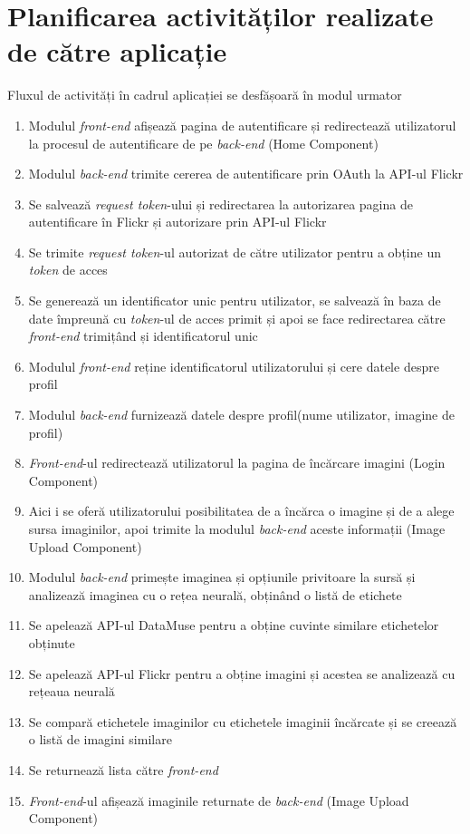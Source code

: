 \section{Planificarea activităților realizate de către aplicație}
Fluxul de activități în cadrul aplicației se desfășoară în modul urmator
\begin{enumerate}
    \item Modulul \textit{front-end} afișează pagina de autentificare și redirectează utilizatorul la procesul de autentificare de pe \textit{back-end} (Home Component)
    \item Modulul \textit{back-end} trimite cererea de autentificare prin OAuth la API-ul Flickr
    \item  Se salvează \textit{request token}-ului și redirectarea la autorizarea pagina de autentificare în Flickr și autorizare prin API-ul Flickr
    \item Se trimite \textit{request token}-ul autorizat de către utilizator pentru a obține un \textit{token} de acces
    \item  Se generează un identificator unic pentru utilizator, se salvează în baza de date împreună cu \textit{token}-ul de acces primit și apoi se face redirectarea către \textit{front-end} trimițând și identificatorul unic
    \item Modulul \textit{front-end} reține identificatorul utilizatorului și cere  datele despre profil 
    \item Modulul \textit{back-end} furnizează datele despre profil(nume utilizator, imagine de profil)
    \item \textit{Front-end}-ul redirectează utilizatorul la pagina de încărcare imagini (Login Component)
    \item Aici i se oferă utilizatorului posibilitatea de a încărca o imagine și de a alege sursa imaginilor, apoi trimite la modulul \textit{back-end} aceste informații (Image Upload Component)
    \item Modulul \textit{back-end} primește imaginea și opțiunile privitoare la sursă și  analizează imaginea cu o rețea neurală, obținând o listă de etichete
    \item Se apelează API-ul DataMuse pentru a obține cuvinte similare etichetelor obținute
    \item Se apelează API-ul Flickr pentru a obține imagini și acestea se  analizează cu rețeaua neurală
    \item Se compară etichetele imaginilor cu etichetele imaginii încărcate și se creează o listă de imagini similare
    \item Se returnează lista către \textit{front-end}
    \item \textit{Front-end}-ul afișează imaginile returnate de \textit{back-end} (Image Upload Component)
\end{enumerate}{}

